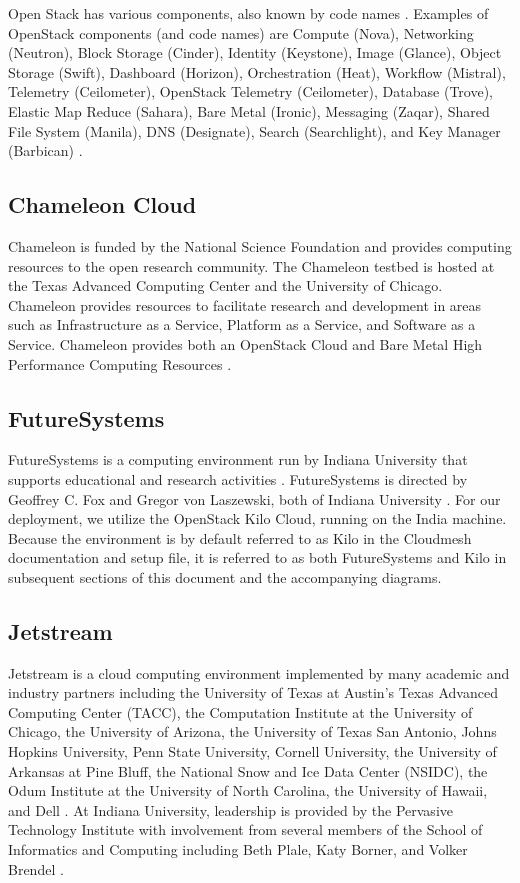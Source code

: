 \documentclass[9pt,twocolumn,twoside]{../../styles/osajnl}
\begin{document}
Open Stack has various components, also known by code names
\cite{www-wikiOpenStack}. Examples of OpenStack components (and code
names) are Compute (Nova), Networking (Neutron), Block Storage
(Cinder), Identity (Keystone), Image (Glance), Object Storage (Swift),
Dashboard (Horizon), Orchestration (Heat), Workflow (Mistral),
Telemetry (Ceilometer), OpenStack Telemetry (Ceilometer), Database
(Trove), Elastic Map Reduce (Sahara), Bare Metal (Ironic), Messaging
(Zaqar), Shared File System (Manila), DNS (Designate), Search
(Searchlight), and Key Manager (Barbican) \cite{www-wikiOpenStack}.

\subsection{Chameleon Cloud}

Chameleon is funded by the National Science Foundation and provides
computing resources to the open research community. The Chameleon
testbed is hosted at the Texas Advanced Computing Center and the
University of Chicago. Chameleon provides resources to facilitate
research and development in areas such as Infrastructure as a Service,
Platform as a Service, and Software as a Service. Chameleon provides
both an OpenStack Cloud and Bare Metal High Performance Computing
Resources \cite{www-chamAbout}.


\subsection{FutureSystems}

FutureSystems is a computing environment run by Indiana University
that supports educational and research activities
\cite{www-futureSystems}. FutureSystems is directed by Geoffrey C. Fox
and Gregor von Laszewski, both of Indiana University
\cite{www-futureSystems}. For our deployment, we utilize the OpenStack
Kilo Cloud, running on the India machine. Because the environment is
by default referred to as Kilo in the Cloudmesh documentation and
setup file, it is referred to as both FutureSystems and Kilo in
subsequent sections of this document and the accompanying diagrams.


\subsection{Jetstream}

Jetstream is a cloud computing environment implemented by many
academic and industry partners including the University of Texas at
Austin's Texas Advanced Computing Center (TACC), the Computation
Institute at the University of Chicago, the University of Arizona, the
University of Texas San Antonio, Johns Hopkins University, Penn State
University, Cornell University, the University of Arkansas at Pine
Bluff, the National Snow and Ice Data Center (NSIDC), the Odum
Institute at the University of North Carolina, the University of
Hawaii, and Dell \cite{www-jetstream1}. At Indiana University,
leadership is provided by the Pervasive Technology Institute with
involvement from several members of the School of Informatics and
Computing including Beth Plale, Katy Borner, and Volker Brendel
\cite{www-jetstream2}.
\end{document}
